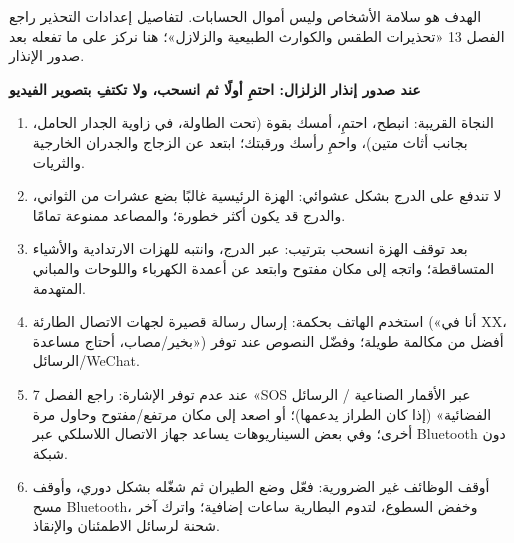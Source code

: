 


الهدف هو سلامة الأشخاص وليس أموال الحسابات. لتفاصيل إعدادات التحذير راجع الفصل 13 «تحذيرات الطقس والكوارث الطبيعية والزلازل»؛ هنا نركز على ما تفعله بعد صدور الإنذار.

\textbf{عند صدور إنذار الزلزال: احتمِ أولًا ثم انسحب، ولا تكتفِ بتصوير الفيديو}\par

\begin{enumerate}
  \item النجاة القريبة: انبطح، احتمِ، أمسك بقوة (تحت الطاولة، في زاوية الجدار الحامل، بجانب أثاث متين)، واحمِ رأسك ورقبتك؛ ابتعد عن الزجاج والجدران الخارجية والثريات.
  \item لا تندفع على الدرج بشكل عشوائي: الهزة الرئيسية غالبًا بضع عشرات من الثواني، والدرج قد يكون أكثر خطورة؛ والمصاعد ممنوعة تمامًا.
  \item بعد توقف الهزة انسحب بترتيب: عبر الدرج، وانتبه للهزات الارتدادية والأشياء المتساقطة؛ واتجه إلى مكان مفتوح وابتعد عن أعمدة الكهرباء واللوحات والمباني المتهدمة.
  \item استخدم الهاتف بحكمة: إرسال رسالة قصيرة لجهات الاتصال الطارئة («أنا في XX، بخير/مصاب، أحتاج مساعدة») أفضل من مكالمة طويلة؛ وفضّل النصوص عند توفر الرسائل/WeChat.
  \item عند عدم توفر الإشارة: راجع الفصل 7 «SOS عبر الأقمار الصناعية / الرسائل الفضائية» (إذا كان الطراز يدعمها)؛ أو اصعد إلى مكان مرتفع/مفتوح وحاول مرة أخرى؛ وفي بعض السيناريوهات يساعد جهاز الاتصال اللاسلكي عبر Bluetooth دون شبكة.
  \item أوقف الوظائف غير الضرورية: فعّل وضع الطيران ثم شغّله بشكل دوري، وأوقف مسح Bluetooth، وخفض السطوع، لتدوم البطارية ساعات إضافية؛ واترك آخر شحنة لرسائل الاطمئنان والإنقاذ.
\end{enumerate}


